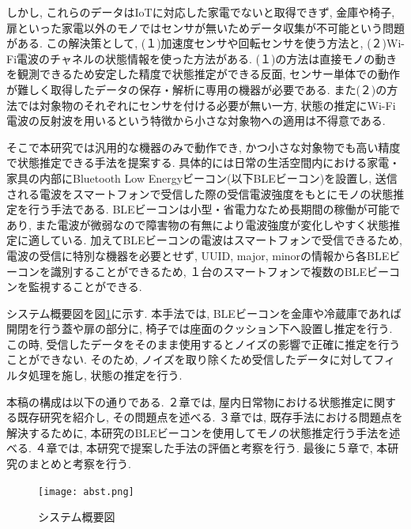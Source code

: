 \documentclass[Japanese]{dicomopapers}
\begin{document}
しかし, これらのデータはIoTに対応した家電でないと取得できず, 金庫や椅子, 扉といった家電以外のモノではセンサが無いためデータ収集が不可能という問題がある.
この解決策として, (１)加速度センサや回転センサを使う方法と, (２)Wi-Fi電波のチャネルの状態情報を使った方法がある.
(１)の方法は直接モノの動きを観測できるため安定した精度で状態推定ができる反面, センサー単体での動作が難しく取得したデータの保存・解析に専用の機器が必要である. %
また(２)の方法では対象物のそれぞれにセンサを付ける必要が無い一方, 状態の推定にWi-Fi電波の反射波を用いるという特徴から小さな対象物への適用は不得意である.

そこで本研究では汎用的な機器のみで動作でき, かつ小さな対象物でも高い精度で状態推定できる手法を提案する.
具体的には日常の生活空間内における家電・家具の内部にBluetooth Low Energyビーコン(以下BLEビーコン)を設置し, 送信される電波をスマートフォンで受信した際の受信電波強度をもとにモノの状態推定を行う手法である.
BLEビーコンは小型・省電力なため長期間の稼働が可能であり, また電波が微弱なので障害物の有無により電波強度が変化しやすく状態推定に適している.
加えてBLEビーコンの電波はスマートフォンで受信できるため, 電波の受信に特別な機器を必要とせず, UUID, major, minorの情報から各BLEビーコンを識別することができるため, １台のスマートフォンで複数のBLEビーコンを監視することができる.

システム概要図を図\ref{abst}に示す.
本手法では, BLEビーコンを金庫や冷蔵庫であれば開閉を行う蓋や扉の部分に, 椅子では座面のクッション下へ設置し推定を行う.
この時, 受信したデータをそのまま使用するとノイズの影響で正確に推定を行うことができない.
そのため, ノイズを取り除くため受信したデータに対してフィルタ処理を施し, 状態の推定を行う.

本稿の構成は以下の通りである.
２章では, 屋内日常物における状態推定に関する既存研究を紹介し, その問題点を述べる.
３章では, 既存手法における問題点を解決するために, 本研究のBLEビーコンを使用してモノの状態推定行う手法を述べる.
４章では, 本研究で提案した手法の評価と考察を行う.
最後に５章で, 本研究のまとめと考察を行う.



\begin{figure}[ht]
 \centering
 \texttt{[image: abst.png]}
 \caption{システム概要図}
 \label{abst}
\end{figure}
\end{document}
